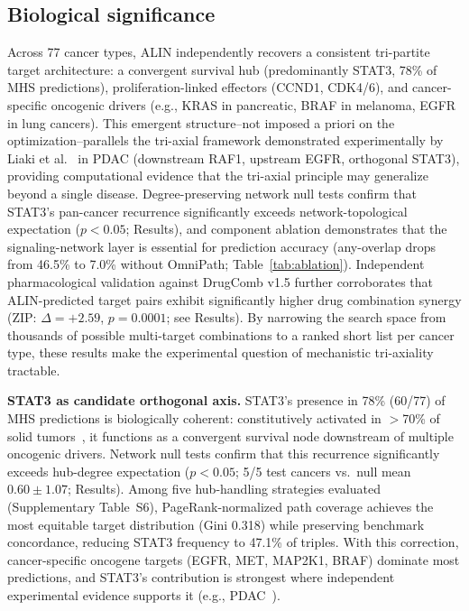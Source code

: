 \documentclass[times, twoside, watermark]{zHenriquesLab-StyleBioRxiv}
\begin{document}
\subsection*{Biological significance}
Across 77 cancer types, ALIN independently recovers a consistent tri-partite target architecture: a convergent survival hub (predominantly STAT3, 78\% of MHS predictions), proliferation-linked effectors (CCND1, CDK4/6), and cancer-specific oncogenic drivers (e.g., KRAS in pancreatic, BRAF in melanoma, EGFR in lung cancers). This emergent structure--not imposed a priori on the optimization--parallels the tri-axial framework demonstrated experimentally by Liaki et al.~\cite{Liaki2025} in PDAC (downstream RAF1, upstream EGFR, orthogonal STAT3), providing computational evidence that the tri-axial principle may generalize beyond a single disease. Degree-preserving network null tests confirm that STAT3's pan-cancer recurrence significantly exceeds network-topological expectation ($p < 0.05$; Results), and component ablation demonstrates that the signaling-network layer is essential for prediction accuracy (any-overlap drops from 46.5\% to 7.0\% without OmniPath; Table~\ref{tab:ablation}). Independent pharmacological validation against DrugComb v1.5 further corroborates that ALIN-predicted target pairs exhibit significantly higher drug combination synergy (ZIP: $\Delta = +2.59$, $p = 0.0001$; see Results). By narrowing the search space from thousands of possible multi-target combinations to a ranked short list per cancer type, these results make the experimental question of mechanistic tri-axiality tractable.

\textbf{STAT3 as candidate orthogonal axis.} STAT3's presence in 78\% (60/77) of MHS predictions is biologically coherent: constitutively activated in $>$70\% of solid tumors~\cite{Yu2004,Frank2007}, it functions as a convergent survival node downstream of multiple oncogenic drivers. Network null tests confirm that this recurrence significantly exceeds hub-degree expectation ($p < 0.05$; 5/5 test cancers vs.\ null mean $0.60 \pm 1.07$; Results). Among five hub-handling strategies evaluated (Supplementary Table~S6), PageRank-normalized path coverage achieves the most equitable target distribution (Gini 0.318) while preserving benchmark concordance, reducing STAT3 frequency to 47.1\% of triples. With this correction, cancer-specific oncogene targets (EGFR, MET, MAP2K1, BRAF) dominate most predictions, and STAT3's contribution is strongest where independent experimental evidence supports it (e.g., PDAC~\cite{Liaki2025}).
\end{document}
